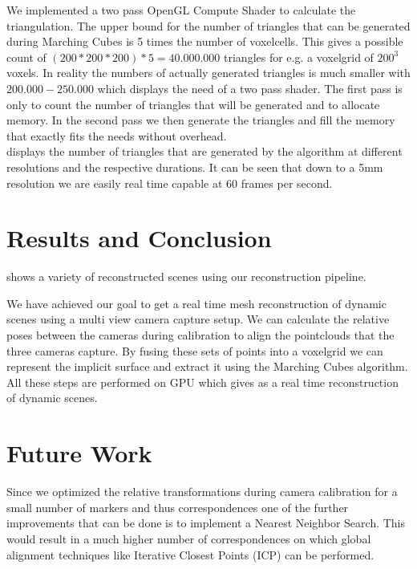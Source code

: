 \documentclass[10pt,twocolumn,letterpaper]{article}
\begin{document}
We implemented a two pass OpenGL Compute Shader to calculate the triangulation. The upper bound for the number of triangles that can be generated during Marching Cubes is 5 times the number of voxelcells. This gives a possible count of $(200 * 200 * 200) * 5 = 40.000.000$ triangles for e.g. a voxelgrid of $200^3$ voxels. In reality the numbers of actually generated triangles is much smaller with $200.000 - 250.000$ which displays the need of a two pass shader. The first pass is only to count the number of triangles that will be generated and to allocate memory. In the second pass we then generate the triangles and fill the memory that exactly fits the needs without overhead.\\
 displays the number of triangles that are generated by the algorithm at different resolutions and the respective durations. It can be seen that down to a 5mm resolution we are easily real time capable at 60 frames per second.

\section{Results and Conclusion}
 shows a variety of reconstructed scenes using our reconstruction pipeline.

We have achieved our goal to get a real time mesh reconstruction of dynamic scenes using a multi view camera capture setup. We can calculate the relative poses between the cameras during calibration to align the pointclouds that the three cameras capture. By fusing these sets of points into a voxelgrid we can represent the implicit surface and extract it using the Marching Cubes algorithm. All these steps are performed on GPU which gives as a real time reconstruction of dynamic scenes.

\section{Future Work}
Since we optimized the relative transformations during camera calibration for a small number of markers and thus correspondences one of the further improvements that can be done is to implement a Nearest Neighbor Search. This would result in a much higher number of correspondences on which global alignment techniques like Iterative Closest Points (ICP) can be performed.
\end{document}
